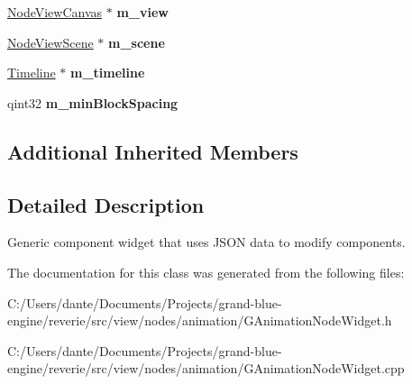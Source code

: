 \begin{Indent}
\begin{DoxyCompactItemize}
\mbox{\hyperlink{classrev_1_1_view_1_1_node_view_canvas}{Node\+View\+Canvas}} $\ast$ {\bfseries m\+\_\+view}
\item 
\mbox{\label{classrev_1_1_view_1_1_animation_node_widget_ad8f9fe5ab933968285072c7a502687af}} 
\mbox{\hyperlink{classrev_1_1_view_1_1_node_view_scene}{Node\+View\+Scene}} $\ast$ {\bfseries m\+\_\+scene}
\item 
\mbox{\label{classrev_1_1_view_1_1_animation_node_widget_a989bc7673022c8fd0ae63021644c7ec6}} 
\mbox{\hyperlink{classrev_1_1_view_1_1_timeline}{Timeline}} $\ast$ {\bfseries m\+\_\+timeline}
\item 
\mbox{\label{classrev_1_1_view_1_1_animation_node_widget_a72c9edeb172214d73596204ee03abdf0}} 
qint32 {\bfseries m\+\_\+min\+Block\+Spacing}
\end{DoxyCompactItemize}
\end{Indent}
\subsection*{Additional Inherited Members}


\subsection{Detailed Description}
Generic component widget that uses J\+S\+ON data to modify components. 

The documentation for this class was generated from the following files\+:\begin{DoxyCompactItemize}
\item 
C\+:/\+Users/dante/\+Documents/\+Projects/grand-\/blue-\/engine/reverie/src/view/nodes/animation/G\+Animation\+Node\+Widget.\+h\item 
C\+:/\+Users/dante/\+Documents/\+Projects/grand-\/blue-\/engine/reverie/src/view/nodes/animation/G\+Animation\+Node\+Widget.\+cpp\end{DoxyCompactItemize}
